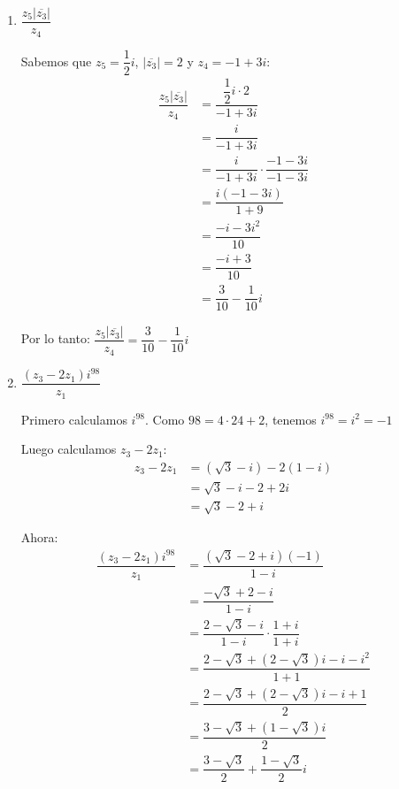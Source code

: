 \documentclass[12pt]{article}
\begin{document}
\begin{enumerate}[label=\alph*.-]
\begin{enumerate}[label=\roman*)]
        Por lo tanto: $\boxed{\dfrac{(z_3)^2}{z_4 - \overline{z_1}} = \dfrac{-(1+\sqrt{3})}{2} + \dfrac{\sqrt{3}-1}{2}i}$

        \newpage
        \item $\dfrac{z_5 |\overline{z_3}|}{z_4}$
        
        Sabemos que $z_5 = \dfrac{1}{2}i$, $|\overline{z_3}| = 2$ y $z_4 = -1+3i$:
        \begin{align*}
        \dfrac{z_5 |\overline{z_3}|}{z_4} &= \dfrac{\dfrac{1}{2}i \cdot 2}{-1+3i} \\[0.3em]
        &= \dfrac{i}{-1+3i} \\[0.3em]
        &= \dfrac{i}{-1+3i} \cdot \dfrac{-1-3i}{-1-3i} \\[0.3em]
        &= \dfrac{i(-1-3i)}{1+9} \\[0.3em]
        &= \dfrac{-i-3i^2}{10} \\[0.3em]
        &= \dfrac{-i+3}{10} \\[0.3em]
        &= \dfrac{3}{10} - \dfrac{1}{10}i
        \end{align*}
        
        Por lo tanto: $\boxed{\dfrac{z_5 |\overline{z_3}|}{z_4} = \dfrac{3}{10} - \dfrac{1}{10}i}$

        \item $\dfrac{(z_3 - 2z_1)i^{98}}{z_1}$
        
        Primero calculamos $i^{98}$. Como $98 = 4 \cdot 24 + 2$, tenemos $i^{98} = i^2 = -1$
        
        Luego calculamos $z_3 - 2z_1$:
        \begin{align*}
        z_3 - 2z_1 &= (\sqrt{3}-i) - 2(1-i) \\[0.3em]
        &= \sqrt{3}-i-2+2i \\[0.3em]
        &= \sqrt{3}-2+i
        \end{align*}
        
        Ahora:
        \begin{align*}
        \dfrac{(z_3 - 2z_1)i^{98}}{z_1} &= \dfrac{(\sqrt{3}-2+i)(-1)}{1-i} \\[0.3em]
        &= \dfrac{-\sqrt{3}+2-i}{1-i} \\[0.3em]
        &= \dfrac{2-\sqrt{3}-i}{1-i} \cdot \dfrac{1+i}{1+i} \\[0.3em]
        &= \dfrac{2-\sqrt{3} + (2-\sqrt{3})i - i - i^2}{1+1} \\[0.3em]
        &= \dfrac{2-\sqrt{3} + (2-\sqrt{3})i - i + 1}{2} \\[0.3em]
        &= \dfrac{3-\sqrt{3} + (1-\sqrt{3})i}{2} \\[0.3em]
        &= \dfrac{3-\sqrt{3}}{2} + \dfrac{1-\sqrt{3}}{2}i
        \end{align*}
        

\end{enumerate}
\end{enumerate}
\end{document}
